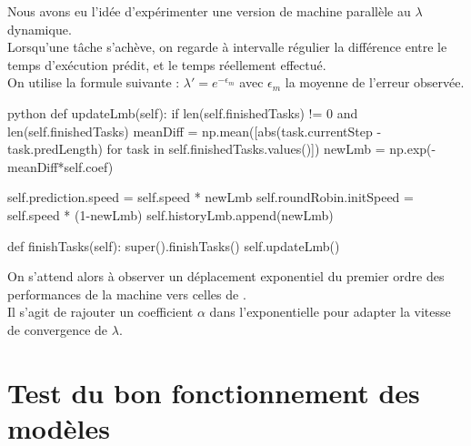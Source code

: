 \documentclass[12pt]{article}
\begin{document}
Nous avons eu l'idée d'expérimenter une version de machine parallèle au $\lambda$ dynamique. \\

Lorsqu'une tâche s'achève, on regarde à intervalle régulier la différence entre le temps d'exécution prédit, et le temps réellement effectué. \\

On utilise la formule suivante : $\lambda' = e^{-\epsilon_m}$ avec $\epsilon_m$ la moyenne de l'erreur observée. \\

\begin{mintedbox}{python}
    def updateLmb(self):
        if len(self.finishedTasks) != 0 and len(self.finishedTasks) %
            meanDiff = np.mean([abs(task.currentStep - task.predLength) for task in self.finishedTasks.values()])
            newLmb = np.exp(-meanDiff*self.coef)
    
            self.prediction.speed = self.speed * newLmb
            self.roundRobin.initSpeed = self.speed * (1-newLmb)
            self.historyLmb.append(newLmb)

    def finishTasks(self):
        super().finishTasks()
        self.updateLmb()
\end{mintedbox}

On s'attend alors à observer un déplacement exponentiel du premier ordre des performances de la machine vers celles de . \\

Il s'agit de rajouter un coefficient $\alpha$ dans l'exponentielle pour adapter la vitesse de convergence de $\lambda$. \\

\newpage

\section{Test du bon fonctionnement des modèles}
\end{document}
